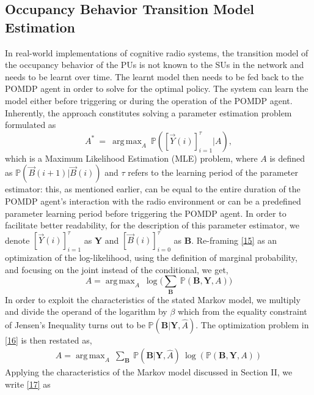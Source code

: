 \documentclass[10pt,twocolumn]{IEEEtran}
\DeclareMathOperator*{\argmax}{arg\,max}
\begin{document}
\subsection{Occupancy Behavior Transition Model Estimation}
In real-world implementations of cognitive radio systems, the transition model of the occupancy behavior of the PUs is not known to the SUs in the network and needs to be learnt over time. The learnt model then needs to be fed back to the POMDP agent in order to solve for the optimal policy. The system can learn the model either before triggering or during the operation of the POMDP agent. Inherently, the approach constitutes solving a parameter estimation problem formulated as
\begin{equation}\label{15}
    A^{*}\ =\ \argmax_{A}\ \mathbb{P}([\vec{Y}(i)]_{i=1}^{\tau}|A),
\end{equation}
which is a Maximum Likelihood Estimation (MLE) problem, where $A$ is defined as $\mathbb{P}(\vec{B}(i+1)|\vec{B}(i))$ and $\tau$ refers to the learning period of the parameter estimator: this, as mentioned earlier, can be equal to the entire duration of the POMDP agent's interaction with the radio environment or can be a predefined parameter learning period before triggering the POMDP agent. In order to facilitate better readability, for the description of this parameter estimator, we denote $[\vec{Y}(i)]_{i=1}^{\tau}$ as \textbf{Y} and $[\vec{B}(i)]_{i=0}^{\tau}$ as \textbf{B}. Re-framing \eqref{15} as an optimization of the log-likelihood, using the definition of marginal probability, and focusing on the joint instead of the conditional, we get,
\begin{equation}\label{16}
    A = \argmax_{A}\ \log\Big(\sum_{\textbf{B}}\ \mathbb{P}(\textbf{B}, \textbf{Y}, A)\Big)
\end{equation}
In order to exploit the characteristics of the stated Markov model, we multiply and divide the operand of the logarithm by $\beta$ which from the equality constraint of Jensen's Inequality turns out to be $\mathbb{P}(\textbf{B}|\textbf{Y}, \hat{A})$. The optimization problem in \eqref{16} is then restated as,
\begin{equation}\label{17}
    \begin{aligned}
        A = \argmax_{A}\ \sum_{\textbf{B}}\ \mathbb{P}(\textbf{B}|\textbf{Y}, \hat{A})\ \log(\mathbb{P}(\textbf{B}, \textbf{Y}, A))
    \end{aligned}
\end{equation}
Applying the characteristics of the Markov model discussed in Section II, we write \eqref{17} as
\end{document}
